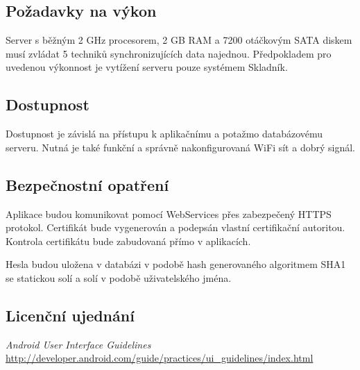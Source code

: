 \documentclass[a4paper,10pt]{article}
\begin{document}
\subsection{Požadavky na výkon}
Server s běžným 2 GHz procesorem, 2 GB RAM a 7200 otáčkovým SATA diskem musí zvládat 5 techniků synchronizujících data najednou. Předpokladem pro uvedenou výkonnost je vytížení serveru pouze systémem Skladník.

\subsection{Dostupnost}
Dostupnost je závislá na přístupu k aplikačnímu a potažmo databázovému serveru. Nutná je také funkční a správně nakonfigurovaná WiFi sít a dobrý signál.

\subsection{Bezpečnostní opatření}
Aplikace budou komunikovat pomocí WebServices přes zabezpečený HTTPS protokol. Certifikát bude vygenerován a podepsán vlastní certifikační autoritou. Kontrola certifikátu bude zabudovaná přímo v aplikacích.

Hesla budou uložena v databázi v podobě hash generovaného algoritmem SHA1 se statickou solí a solí v podobě uživatelského jména.
\subsection{Licenční ujednání}
\begin{thebibliography}{1}
	{\em Android User Interface Guidelines}	\url{http://developer.android.com/guide/practices/ui_guidelines/index.html}
\end{thebibliography}
\end{document}
